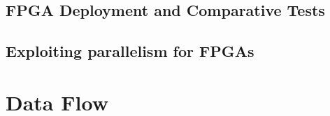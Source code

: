 
\subsection{FPGA Deployment and Comparative Tests}

\subsection{Exploiting parallelism for FPGAs}

\section{Data Flow}
